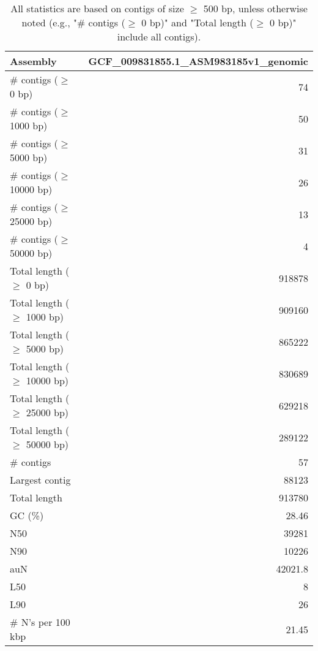 \documentclass[12pt,a4paper]{article}
\begin{document}
\begin{table}[ht]
\begin{center}
\caption{All statistics are based on contigs of size $\geq$ 500 bp, unless otherwise noted (e.g., "\# contigs ($\geq$ 0 bp)" and "Total length ($\geq$ 0 bp)" include all contigs).}
\begin{tabular}{|l*{1}{|r}|}
\hline
Assembly & GCF\_009831855.1\_ASM983185v1\_genomic \\ \hline
\# contigs ($\geq$ 0 bp) & 74 \\ \hline
\# contigs ($\geq$ 1000 bp) & 50 \\ \hline
\# contigs ($\geq$ 5000 bp) & 31 \\ \hline
\# contigs ($\geq$ 10000 bp) & 26 \\ \hline
\# contigs ($\geq$ 25000 bp) & 13 \\ \hline
\# contigs ($\geq$ 50000 bp) & 4 \\ \hline
Total length ($\geq$ 0 bp) & 918878 \\ \hline
Total length ($\geq$ 1000 bp) & 909160 \\ \hline
Total length ($\geq$ 5000 bp) & 865222 \\ \hline
Total length ($\geq$ 10000 bp) & 830689 \\ \hline
Total length ($\geq$ 25000 bp) & 629218 \\ \hline
Total length ($\geq$ 50000 bp) & 289122 \\ \hline
\# contigs & 57 \\ \hline
Largest contig & 88123 \\ \hline
Total length & 913780 \\ \hline
GC (\%) & 28.46 \\ \hline
N50 & 39281 \\ \hline
N90 & 10226 \\ \hline
auN & 42021.8 \\ \hline
L50 & 8 \\ \hline
L90 & 26 \\ \hline
\# N's per 100 kbp & 21.45 \\ \hline
\end{tabular}
\end{center}
\end{table}
\end{document}
